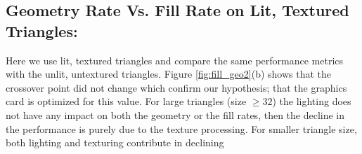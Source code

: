 \subsection{Geometry Rate Vs. Fill Rate on Lit, Textured Triangles:}
Here we use lit, textured triangles and compare the same performance metrics with the unlit, untextured triangles. Figure \ref{fig:fill_geo2}(b) shows that the crossover point did not change which confirm our hypothesis; that the graphics card is optimized for this value. For large triangles (size $\geq 32$) the lighting does not have any impact on both the geometry or the fill rates, then the decline in the performance is purely due to the texture processing. For smaller triangle size, both lighting and texturing contribute in declining

